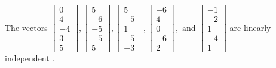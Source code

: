 \begin{exercise}
\begin{exerciseStatement}
  \end{exerciseStatement}
  \begin{exerciseAnswer}
   The vectors \(\left[\begin{array}{r}
0 \\
4 \\
-4 \\
3 \\
5
\end{array}\right] , \left[\begin{array}{r}
5 \\
-6 \\
-5 \\
-5 \\
5
\end{array}\right] , \left[\begin{array}{r}
5 \\
-5 \\
1 \\
-5 \\
-3
\end{array}\right] , \left[\begin{array}{r}
-6 \\
4 \\
0 \\
-6 \\
2
\end{array}\right] , \text{ and } \left[\begin{array}{r}
-1 \\
-2 \\
1 \\
-4 \\
1
\end{array}\right]\) are 
  	 linearly independent  .
  


  \end{exerciseAnswer}
\end{exercise}